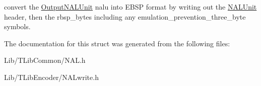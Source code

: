 convert the \hyperlink{struct_output_n_a_l_unit}{Output\+N\+A\+L\+Unit} nalu into E\+B\+SP format by writing out the \hyperlink{struct_n_a_l_unit}{N\+A\+L\+Unit} header, then the rbsp\+\_\+bytes including any emulation\+\_\+prevention\+\_\+three\+\_\+byte symbols. 

The documentation for this struct was generated from the following files\+:\begin{DoxyCompactItemize}
\item 
Lib/\+T\+Lib\+Common/N\+A\+L.\+h\item 
Lib/\+T\+Lib\+Encoder/N\+A\+Lwrite.\+h\end{DoxyCompactItemize}
